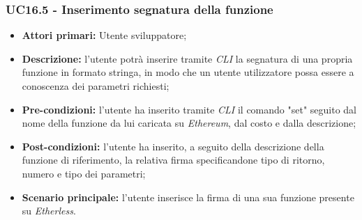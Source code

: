 \subsubsection{UC16.5 - Inserimento segnatura della funzione}
\begin{itemize}
	\item \textbf{Attori primari:} Utente sviluppatore;
	\item \textbf{Descrizione:} l'utente potrà inserire tramite \textit{CLI} la segnatura di una propria funzione in formato stringa, in modo che un utente utilizzatore possa essere a conoscenza dei parametri richiesti; 
	\item \textbf{Pre-condizioni:} l'utente ha inserito tramite \textit{CLI\glo} il comando "set" seguito dal nome della funzione da lui caricata su \textit{Ethereum}, dal costo e dalla descrizione;
	\item \textbf{Post-condizioni:} l'utente ha inserito, a seguito della descrizione della funzione di riferimento, la relativa firma specificandone tipo di ritorno, numero e tipo dei parametri;
	\item \textbf{Scenario principale:} l'utente inserisce la firma di una sua funzione presente su \textit{Etherless}.
\end{itemize}